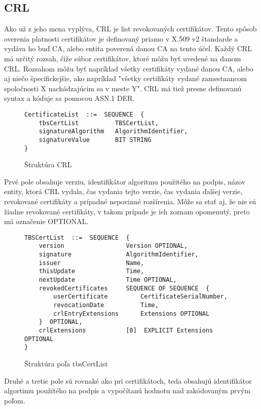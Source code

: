 \documentclass[12pt, twoside]{book}
\begin{document}
\subsection{CRL}
Ako už z jeho mena vyplýva, CRL je list revokovaných certifikátov. Tento spôsob overenia platnosti certifikátov je definovaný priamo v X.509 v2 štandarde a vydáva ho buď CA, alebo entita poverená danou CA na tento účel. Každý CRL má určitý rozsah, čiže súbor certifikátov, ktoré môžu byť uvedené na danom CRL. Rozsahom môžu byť  napríklad všetky certifikáty vydané danou CA, alebo aj niečo špecifickejšie, ako napríklad "všetky certifikáty vydané zamestnancom spoločnosti X nachádzajúcim sa v meste Y". CRL má tiež presne definovanú syntax a kóduje sa pomocou ASN.1 DER.\cite{rfc5280}

\begin{figure}[H]
\begin{lstlisting}
CertificateList  ::=  SEQUENCE  {
    tbsCertList          TBSCertList,
    signatureAlgorithm   AlgorithmIdentifier,
    signatureValue       BIT STRING
}
\end{lstlisting}
\caption{Štruktúra CRL}
\end{figure}

\newpage
Prvé pole obsahuje verziu, identifikátor algoritmu použitého na podpis, názov entity, ktorá CRL vydala, čas vydania tejto verzie, čas vydania ďalšej verzie, revokované certifikáty a prípadné nepovinné rozšírenia. Môže sa stať aj, že nie sú žiadne revokované certifikáty, v takom prípade je ich zoznam opomenutý, preto má označenie OPTIONAL.\cite{rfc5280}

\begin{figure}[H]
\begin{lstlisting}
TBSCertList  ::=  SEQUENCE  {
    version                 Version OPTIONAL,
    signature               AlgorithmIdentifier,
    issuer                  Name,
    thisUpdate              Time,
    nextUpdate              Time OPTIONAL,
    revokedCertificates     SEQUENCE OF SEQUENCE  {
        userCertificate         CertificateSerialNumber,
        revocationDate          Time,
        crlEntryExtensions      Extensions OPTIONAL
    }  OPTIONAL,
    crlExtensions           [0]  EXPLICIT Extensions OPTIONAL
}
\end{lstlisting}
\caption{Štruktúra poľa tbsCertList}
\end{figure}

Druhé a tretie pole sú rovnaké ako pri certifikátoch, teda obsahujú identifikátor algortimu použitého na podpis a vypočítanú hodnotu nad zakódovaným prvým poľom.\cite{rfc5280}
\end{document}
